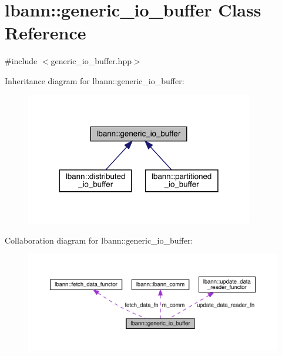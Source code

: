 \hypertarget{classlbann_1_1generic__io__buffer}{}\section{lbann\+:\+:generic\+\_\+io\+\_\+buffer Class Reference}
\label{classlbann_1_1generic__io__buffer}


{\ttfamily \#include $<$generic\+\_\+io\+\_\+buffer.\+hpp$>$}



Inheritance diagram for lbann\+:\+:generic\+\_\+io\+\_\+buffer\+:\nopagebreak
\begin{figure}[H]
\begin{center}
\leavevmode
\includegraphics[width=282pt]{classlbann_1_1generic__io__buffer__inherit__graph}
\end{center}
\end{figure}


Collaboration diagram for lbann\+:\+:generic\+\_\+io\+\_\+buffer\+:\nopagebreak
\begin{figure}[H]
\begin{center}
\leavevmode
\includegraphics[width=350pt]{classlbann_1_1generic__io__buffer__coll__graph}
\end{center}
\end{figure}
